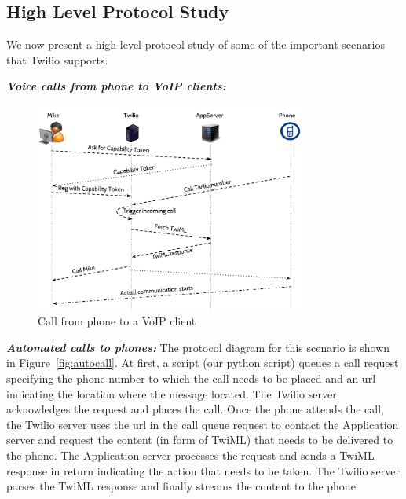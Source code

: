 \subsection{High Level Protocol Study}
\label{subsec-protostudy}
We now present a high level protocol study of some of the important scenarios that Twilio supports. 

 
\emph{\textbf{Voice calls from phone to VoIP clients:} }
\begin{figure}[t!] 
\centering
  \includegraphics[width=0.8\textwidth]{figs/p2c.pdf}
\caption{Call from phone to a VoIP client}
\label{fig:callfromphone}
\end{figure}

\emph{\textbf{Automated calls to phones:} }
The protocol diagram for this scenario is shown in  Figure~\ref{fig:autocall}. At first, a script (our python script) queues a call request specifying the phone number to which the call needs to be placed and an url indicating the location where the message located. The Twilio server acknowledges the request and places the call. Once the phone attends the call, the Twilio server uses the url in the call queue request to contact the Application server and request the content (in form of TwiML) that needs to be delivered to the phone. The Application server processes the request and sends a TwiML response in return indicating the action that needs to be taken. The Twilio server parses the TwiML response and finally streams the content to the phone.  


